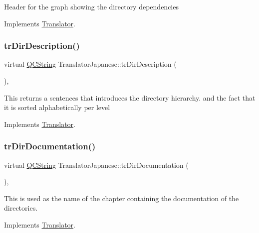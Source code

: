 Header for the graph showing the directory dependencies 

Implements \mbox{\hyperlink{class_translator}{Translator}}.

\mbox{\label{class_translator_japanese_a532fd52072df57839b31a51c58b0a5f7}} 
\subsubsection{\texorpdfstring{trDirDescription()}{trDirDescription()}}
{\footnotesize\ttfamily virtual \mbox{\hyperlink{class_q_c_string}{Q\+C\+String}} Translator\+Japanese\+::tr\+Dir\+Description (\begin{DoxyParamCaption}{ }\end{DoxyParamCaption})\hspace{0.3cm}{\ttfamily [inline]}, {\ttfamily [virtual]}}

This returns a sentences that introduces the directory hierarchy. and the fact that it is sorted alphabetically per level 

Implements \mbox{\hyperlink{class_translator}{Translator}}.

\mbox{\label{class_translator_japanese_a9e9000357236606370551cd6e26ed037}} 
\subsubsection{\texorpdfstring{trDirDocumentation()}{trDirDocumentation()}}
{\footnotesize\ttfamily virtual \mbox{\hyperlink{class_q_c_string}{Q\+C\+String}} Translator\+Japanese\+::tr\+Dir\+Documentation (\begin{DoxyParamCaption}{ }\end{DoxyParamCaption})\hspace{0.3cm}{\ttfamily [inline]}, {\ttfamily [virtual]}}

This is used as the name of the chapter containing the documentation of the directories. 

Implements \mbox{\hyperlink{class_translator}{Translator}}.

